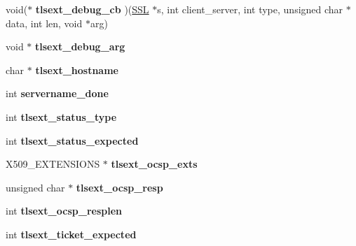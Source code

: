 \begin{DoxyCompactItemize}
\item 
\hypertarget{structssl__st_af36d613ef84698654b438baf81872ee6}{}void($\ast$ {\bfseries tlsext\+\_\+debug\+\_\+cb} )(\hyperlink{structssl__st}{S\+S\+L} $\ast$s, int client\+\_\+server, int type, unsigned char $\ast$data, int len, void $\ast$arg)\label{structssl__st_af36d613ef84698654b438baf81872ee6}

\item 
\hypertarget{structssl__st_a37c9fa10121176491c8a9e5617f7be83}{}void $\ast$ {\bfseries tlsext\+\_\+debug\+\_\+arg}\label{structssl__st_a37c9fa10121176491c8a9e5617f7be83}

\item 
\hypertarget{structssl__st_a693888a588035f237e93b0bce7af4b84}{}char $\ast$ {\bfseries tlsext\+\_\+hostname}\label{structssl__st_a693888a588035f237e93b0bce7af4b84}

\item 
\hypertarget{structssl__st_ac1ac6725cca99bc51b875fbe62ccb504}{}int {\bfseries servername\+\_\+done}\label{structssl__st_ac1ac6725cca99bc51b875fbe62ccb504}

\item 
\hypertarget{structssl__st_aba46c200c19caf4051d001f5ca0475e3}{}int {\bfseries tlsext\+\_\+status\+\_\+type}\label{structssl__st_aba46c200c19caf4051d001f5ca0475e3}

\item 
\hypertarget{structssl__st_a0a0d75de2cdedb99c07403d56aa9ae8c}{}int {\bfseries tlsext\+\_\+status\+\_\+expected}\label{structssl__st_a0a0d75de2cdedb99c07403d56aa9ae8c}

\item 
\hypertarget{structssl__st_a234c465dc9c34dde4ac3cc24a79467a1}{}X509\+\_\+\+E\+X\+T\+E\+N\+S\+I\+O\+N\+S $\ast$ {\bfseries tlsext\+\_\+ocsp\+\_\+exts}\label{structssl__st_a234c465dc9c34dde4ac3cc24a79467a1}

\item 
\hypertarget{structssl__st_ab54a13d08a8b115b2a7897c9213b1fb7}{}unsigned char $\ast$ {\bfseries tlsext\+\_\+ocsp\+\_\+resp}\label{structssl__st_ab54a13d08a8b115b2a7897c9213b1fb7}

\item 
\hypertarget{structssl__st_a4a86cdf17eb779e0d6e467105103eb5f}{}int {\bfseries tlsext\+\_\+ocsp\+\_\+resplen}\label{structssl__st_a4a86cdf17eb779e0d6e467105103eb5f}

\item 
\hypertarget{structssl__st_ac3163b212ec333ebcfba794e683be1d2}{}int {\bfseries tlsext\+\_\+ticket\+\_\+expected}\label{structssl__st_ac3163b212ec333ebcfba794e683be1d2}


\end{DoxyCompactItemize}
